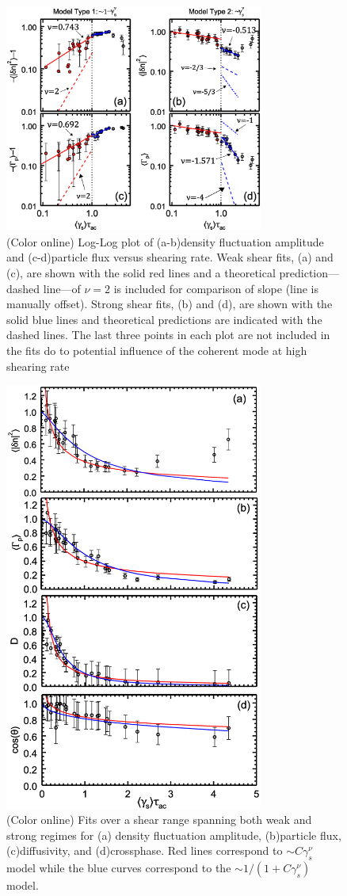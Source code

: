 \documentclass[aip,pop,amsmath,amssymb,preprint,superscriptaddress]{revtex4-1} %
\begin{document}
\begin{figure}[!htbp]
\centerline{
\includegraphics[width=8.5cm]{figure8.eps}}
\caption{\label{fig:densloglog_strong} (Color online) Log-Log plot of (a-b)density
  fluctuation amplitude and (c-d)particle flux versus shearing rate. Weak shear fits, (a) and (c), are shown with the solid red lines and a theoretical prediction---dashed line---of $\nu = 2$ is included for comparison of slope (line is manually offset). Strong shear fits, (b) and (d), are shown with the solid blue lines and theoretical predictions are indicated with the dashed lines. The last three points in each plot are not included in the fits do to potential influence of the coherent mode at high shearing rate}
\end{figure}

\begin{figure}[!htbp]
\centerline{
\includegraphics[width=8.5cm]{figure9.eps}}
\caption{\label{fig:fullrange_fits} (Color online) Fits over a shear range spanning both weak and strong regimes for (a) density fluctuation amplitude, (b)particle flux, (c)diffusivity, and (d)crossphase. Red lines correspond to $\sim C\gamma_{s}^{\nu}$ model while the blue curves correspond to the $\sim 1/(1+C\gamma_{s}^{\nu})$ model.}
\end{figure}
\end{document}
